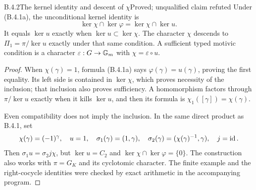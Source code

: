 \begin{result}{B.4.2}{The kernel identity and descent of $\chi$}{Proved; unqualified claim refuted}
Under (B.4.1a), the unconditional kernel identity is
\[
             \ker\chi\cap\ker\varphi=\ker\chi\cap\ker u.
\]
It equals $\ker u$ exactly when $\ker u\subset\ker\chi$.
The character $\chi$ descends to $\Pi_1=\pi/\ker u$ exactly
under that same condition. A sufficient typed motivic condition
is a character $\varepsilon:G\to\mathbb G_m$ with
$\chi=\varepsilon\circ u$.
\end{result}
\begin{proof}
When $\chi(\gamma)=1$, formula (B.4.1a) says
$\varphi(\gamma)=u(\gamma)$, proving the first equality.
Its left side is contained in $\ker\chi$, which proves
necessity of the inclusion; that inclusion also proves
sufficiency. A homomorphism factors through $\pi/\ker u$
exactly when it kills $\ker u$, and then its formula is
$\chi_1([\gamma])=\chi(\gamma)$.

Even compatibility does not imply the inclusion. In the same
direct product as B.4.1, set
\[
 \chi(\gamma)=(-1)^\gamma,\quad u=1,\quad
 \sigma_1(\gamma)=(1,\gamma),\quad
 \sigma_2(\gamma)=(\chi(\gamma)^{-1},\gamma),\quad j=\operatorname{id}.
\]
Then $\sigma_1u=\sigma_2j\chi$, but
$\ker u=C_2$ and $\ker\chi\cap\ker\varphi=\{0\}$.
The construction also works with $\pi=G_K$ and its cyclotomic
character. The finite example and the right-cocycle identities
were checked by exact arithmetic in the accompanying program.
\end{proof}

